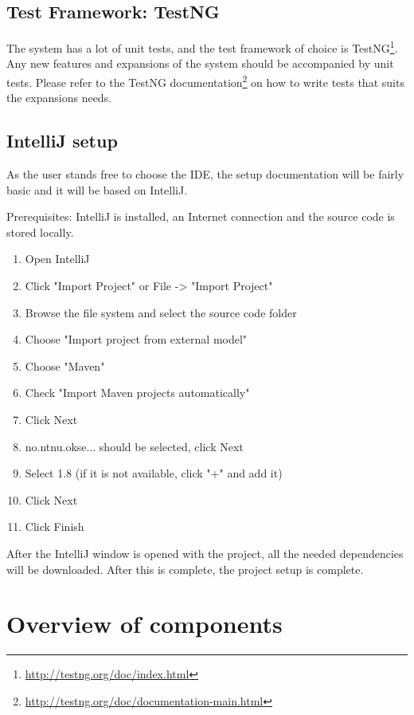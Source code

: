\subsection{Test Framework: TestNG}
The system has a lot of unit tests, and the test framework of choice is TestNG\footnote{\url{http://testng.org/doc/index.html}}. Any new features and expansions of the system should be accompanied by unit tests. Please refer to the TestNG documentation\footnote{\url{http://testng.org/doc/documentation-main.html}} on how to write tests that suits the expansions needs.

\subsection{IntelliJ setup}
As the user stands free to choose the IDE, the setup documentation will be fairly basic and it will be based on IntelliJ.

Prerequisites: IntelliJ is installed, an Internet connection and the source code is stored locally.

\begin{enumerate}
    \item Open IntelliJ
    \item Click "Import Project" or File -> "Import Project"
    \item Browse the file system and select the source code folder
    \item Choose "Import project from external model"
    \item Choose "Maven"
    \item Check "Import Maven projects automatically"
    \item Click Next
    \item no.ntnu.okse... should be selected, click Next
    \item Select 1.8 (if it is not available, click "+" and add it)
    \item Click Next
    \item Click Finish
\end{enumerate}

After the IntelliJ window is opened with the project, all the needed dependencies will be downloaded. After this is complete, the project setup is complete.

\section{Overview of components}

